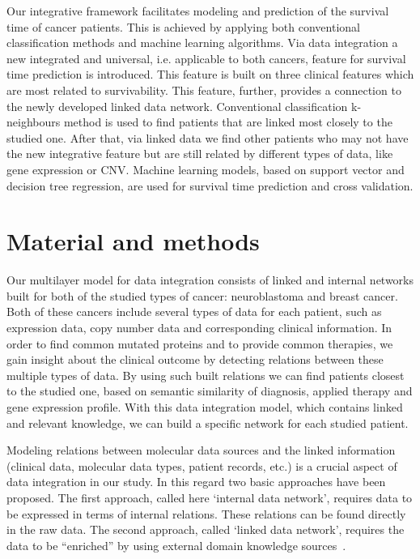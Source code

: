 \documentclass{bmcart}
\begin{document}
Our integrative framework facilitates modeling and prediction of the
survival time of cancer patients. This is achieved by applying both
conventional classification methods and machine learning algorithms.
Via data integration a new integrated and universal, i.e. applicable to
both cancers, feature for survival time prediction is introduced. This
feature is built on three clinical features which are most related to
survivability. This feature, further, provides a connection to the
newly developed linked data network. Conventional classification
k-neighbours method is used to find patients that are linked most
closely to the studied one. After that, via linked data we find other
patients who may not have the new integrative feature but are still
related by different types of data, like gene expression or CNV.
Machine learning models, based on support vector and decision tree
regression, are used for survival time prediction and cross validation.

\section{Material and methods}

Our multilayer model for data integration consists of linked and
internal networks built for both of the studied types of cancer:
neuroblastoma and breast cancer. Both of these cancers include several
types of data for each patient, such as expression data, copy number
data and corresponding clinical information. In order to find common
mutated proteins and to provide common therapies, we gain insight about
the clinical outcome by detecting relations between these multiple
types of data. By using such built relations we can find patients
closest to the studied one, based on semantic similarity of diagnosis,
applied therapy and gene expression profile. With this data integration
model, which contains linked and relevant knowledge, we can build a
specific network for each studied patient.

Modeling relations between molecular data sources and the linked
information (clinical data, molecular data types, patient records,
etc.) is a crucial aspect of data integration in our study. In this
regard two basic approaches have been proposed. The first approach,
called here {\textquoteleft}internal data network{\textquoteright},
requires data to be expressed in terms of internal relations. These
relations can be found directly in the raw data. The second approach,
called {\textquoteleft}linked data network{\textquoteright}, requires
the data to be {\textquotedblleft}enriched{\textquotedblright} by using
external domain knowledge sources~\cite{13}.
\end{document}
